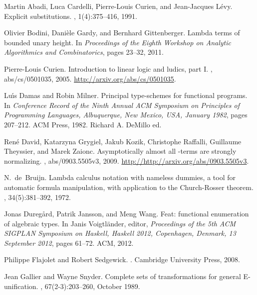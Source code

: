 \documentclass{jfp1}
\begin{document}
\begin{thebibliography}{10}

Martin Abadi, Luca Cardelli, Pierre-Louis Curien, and Jean-Jacques L{\'e}vy.
\newblock Explicit substitutions.
, 1(4):375--416, 1991.

Olivier Bodini, Dani\`ele Gardy, and Bernhard Gittenberger.
\newblock Lambda terms of bounded unary height.
\newblock In {\em Proceedings of the Eighth Workshop on Analytic Algorithmics
  and Combinatorics}, pages 23--32, 2011.

Pierre-Louis Curien.
\newblock Introduction to linear logic and ludics, part {I}.
, abs/cs/0501035, 2005.
\newblock \url{http://arxiv.org/abs/cs/0501035}.

Lu\'{\i}s Damas and Robin Milner.
\newblock Principal type-schemes for functional programs.
\newblock In {\em Conference Record of the Ninth Annual {ACM} {Symposium on
  Principles of Programming Languages}, Albuquerque, New Mexico, USA, January
  1982}, pages 207--212. ACM Press, 1982.
\newblock Richard A. DeMillo ed.

Ren{\'e} David, Katarzyna Grygiel, Jakub Kozik, Christophe Raffalli, Guillaume
  Theyssier, and Marek Zaionc.
\newblock Asymptotically almost all -terms are strongly normalizing.
, abs/0903.5505v3, 2009.
\newblock \url{http://http://arxiv.org/abs/0903.5505v3}.

N.~de~Bruijn.
\newblock Lambda calculus notation with nameless dummies, a tool for automatic
  formula manipulation, with application to the {Church-Rosser} theorem.
, 34(5):381--392, 1972.

Jonas Dureg{\aa}rd, Patrik Jansson, and Meng Wang.
\newblock Feat: functional enumeration of algebraic types.
\newblock In Janis Voigtl{\"a}nder, editor, {\em Proceedings of the 5th {ACM
  SIGPLAN} {Symposium on Haskell, Haskell} 2012, {Copenhagen, Denmark}, 13
  {September} 2012}, pages 61--72. ACM, 2012.

Philippe Flajolet and Robert Sedgewick.
.
\newblock Cambridge University Press, 2008.

Jean Gallier and Wayne Snyder.
\newblock Complete sets of transformations for general {E}-unification.
, 67(2-3):203--260, October 1989.


\end{thebibliography}
\end{document}
